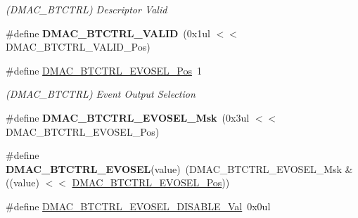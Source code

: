 \begin{DoxyCompactItemize}
\begin{DoxyCompactList}\small\item\em (D\+M\+A\+C\+\_\+\+B\+T\+C\+T\+R\+L) Descriptor Valid \end{DoxyCompactList}\item 
\hypertarget{group___s_a_m_l21___d_m_a_c_gaa4df97835c30814df2a34adeb702edee}{}\#define {\bfseries D\+M\+A\+C\+\_\+\+B\+T\+C\+T\+R\+L\+\_\+\+V\+A\+L\+I\+D}~(0x1ul $<$$<$ D\+M\+A\+C\+\_\+\+B\+T\+C\+T\+R\+L\+\_\+\+V\+A\+L\+I\+D\+\_\+\+Pos)\label{group___s_a_m_l21___d_m_a_c_gaa4df97835c30814df2a34adeb702edee}

\item 
\hypertarget{group___s_a_m_l21___d_m_a_c_ga1f5b7dc4dab8086525a4bcb012d380b6}{}\#define \hyperlink{group___s_a_m_l21___d_m_a_c_ga1f5b7dc4dab8086525a4bcb012d380b6}{D\+M\+A\+C\+\_\+\+B\+T\+C\+T\+R\+L\+\_\+\+E\+V\+O\+S\+E\+L\+\_\+\+Pos}~1\label{group___s_a_m_l21___d_m_a_c_ga1f5b7dc4dab8086525a4bcb012d380b6}

\begin{DoxyCompactList}\small\item\em (D\+M\+A\+C\+\_\+\+B\+T\+C\+T\+R\+L) Event Output Selection \end{DoxyCompactList}\item 
\hypertarget{group___s_a_m_l21___d_m_a_c_ga98d6e69ae7dbf6d4d690459296d00ad5}{}\#define {\bfseries D\+M\+A\+C\+\_\+\+B\+T\+C\+T\+R\+L\+\_\+\+E\+V\+O\+S\+E\+L\+\_\+\+Msk}~(0x3ul $<$$<$ D\+M\+A\+C\+\_\+\+B\+T\+C\+T\+R\+L\+\_\+\+E\+V\+O\+S\+E\+L\+\_\+\+Pos)\label{group___s_a_m_l21___d_m_a_c_ga98d6e69ae7dbf6d4d690459296d00ad5}

\item 
\hypertarget{group___s_a_m_l21___d_m_a_c_gac29e97d669d4797bba37a5130080193d}{}\#define {\bfseries D\+M\+A\+C\+\_\+\+B\+T\+C\+T\+R\+L\+\_\+\+E\+V\+O\+S\+E\+L}(value)~(D\+M\+A\+C\+\_\+\+B\+T\+C\+T\+R\+L\+\_\+\+E\+V\+O\+S\+E\+L\+\_\+\+Msk \& ((value) $<$$<$ \hyperlink{group___s_a_m_l21___d_m_a_c_ga1f5b7dc4dab8086525a4bcb012d380b6}{D\+M\+A\+C\+\_\+\+B\+T\+C\+T\+R\+L\+\_\+\+E\+V\+O\+S\+E\+L\+\_\+\+Pos}))\label{group___s_a_m_l21___d_m_a_c_gac29e97d669d4797bba37a5130080193d}

\item 
\hypertarget{group___s_a_m_l21___d_m_a_c_ga3edd13f0e4d5f2626d4465cc0b3c35c1}{}\#define \hyperlink{group___s_a_m_l21___d_m_a_c_ga3edd13f0e4d5f2626d4465cc0b3c35c1}{D\+M\+A\+C\+\_\+\+B\+T\+C\+T\+R\+L\+\_\+\+E\+V\+O\+S\+E\+L\+\_\+\+D\+I\+S\+A\+B\+L\+E\+\_\+\+Val}~0x0ul\label{group___s_a_m_l21___d_m_a_c_ga3edd13f0e4d5f2626d4465cc0b3c35c1}


\end{DoxyCompactItemize}
